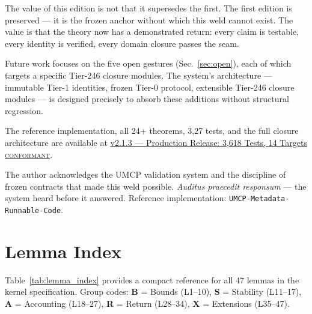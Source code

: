 \documentclass[
  aps,
  prd,
  preprint,
  superscriptaddress,
  nofootinbib,
  floatfix,
  longbibliography
]{revtex4-2}
\newcommand{\regime}[1]{\textrm{\upshape\scshape#1}}
\newcommand{\lat}[1]{\textit{#1}}
\begin{document}
The value of this edition is not that it supersedes the first.
The first edition is preserved — it is the frozen anchor
without which this weld cannot exist.
The value is that the theory now has a demonstrated return:
every claim is testable, every identity is verified,
every domain closure passes the seam.

Future work focuses on the five open gestures
(Sec.~\ref{sec:open}), each of which targets a specific
Tier-246 closure modules. The system's architecture —
immutable Tier-1 identities, frozen Tier-0 protocol,
extensible Tier-246 closure modules — is designed precisely
to absorb these additions without structural regression.

The reference implementation, all 24+ theorems,
3{,}27 tests, and the full closure architecture are
available at
\href{https://github.com/calebpruett927/GENERATIVE-COLLAPSE-DYNAMICS/releases/tag/v2.1.3}{v2.1.3 --- Production Release: 3{,}618 Tests, 14 Targets \regime{conformant}}.

\begin{acknowledgments}
The author acknowledges the UMCP validation system and the
discipline of frozen contracts that made this weld possible.
\lat{Auditus praecedit responsum} --- the system heard before
it answered. Reference implementation:
\texttt{UMCP-Metadata-Runnable-Code}.
\end{acknowledgments}



\appendix

\section{Lemma Index}\label{app:lemmas}

Table~\ref{tab:lemma_index} provides a compact reference
for all 47 lemmas in the kernel specification.
Group codes: \textbf{B} = Bounds (L1--10),
\textbf{S} = Stability (L11--17),
\textbf{A} = Accounting (L18--27),
\textbf{R} = Return (L28--34),
\textbf{X} = Extensions (L35--47).
\end{document}
